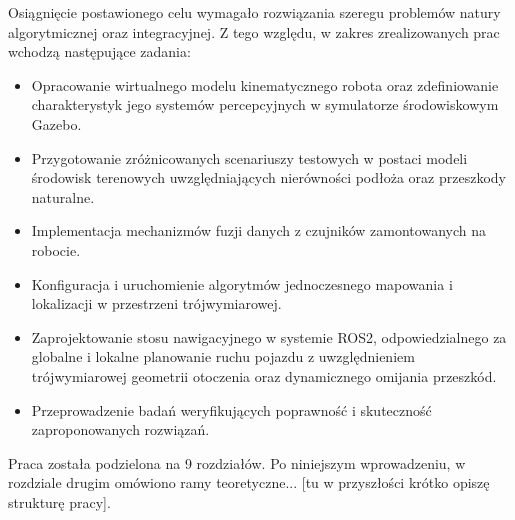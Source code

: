 \documentclass[a4paper,twoside,12pt]{book}
\begin{document}
Osiągnięcie postawionego celu wymagało rozwiązania szeregu problemów natury algorytmicznej oraz integracyjnej. Z tego względu, w zakres zrealizowanych prac wchodzą następujące zadania:
\begin{itemize}
    \item Opracowanie wirtualnego modelu kinematycznego robota oraz zdefiniowanie charakterystyk jego systemów percepcyjnych w symulatorze środowiskowym Gazebo.
    \item Przygotowanie zróżnicowanych scenariuszy testowych w postaci modeli środowisk terenowych uwzględniających nierówności podłoża oraz przeszkody naturalne.
    \item Implementacja mechanizmów fuzji danych z czujników zamontowanych na robocie.
    \item Konfiguracja i uruchomienie algorytmów jednoczesnego mapowania i lokalizacji w przestrzeni trójwymiarowej.
    \item Zaprojektowanie stosu nawigacyjnego w systemie ROS2, odpowiedzialnego za globalne i lokalne planowanie ruchu pojazdu z uwzględnieniem trójwymiarowej geometrii otoczenia oraz dynamicznego omijania przeszkód.
    \item Przeprowadzenie badań weryfikujących poprawność i skuteczność zaproponowanych rozwiązań.
\end{itemize}

Praca została podzielona na 9 rozdziałów. Po niniejszym wprowadzeniu, w rozdziale drugim omówiono ramy teoretyczne... [tu w przyszłości krótko opiszę strukturę pracy].

\end{document}
